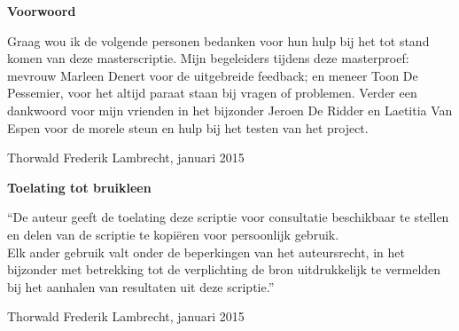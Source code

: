 
\newpage

\noindent \textbf{\huge Voorwoord}

\vspace{1.5cm}

\noindent


Graag wou ik de volgende personen bedanken voor hun hulp bij het tot stand komen van deze masterscriptie. Mijn begeleiders tijdens deze masterproef: mevrouw Marleen Denert voor de uitgebreide feedback; en meneer Toon De Pessemier, voor het altijd paraat staan bij vragen of problemen.
Verder een dankwoord voor mijn vrienden in het bijzonder Jeroen De Ridder en Laetitia Van Espen voor de morele steun en hulp bij het testen van het project.

\addvspace{4cm}

\noindent Thorwald Frederik Lambrecht, januari 2015\newpage

\noindent \textbf{\huge Toelating tot bruikleen}

\vspace{1.5cm}

\noindent
``De auteur geeft de toelating deze scriptie voor consultatie beschikbaar
te stellen en delen van de scriptie te kopi\"eren voor persoonlijk
gebruik.\\
Elk ander gebruik valt onder de beperkingen van het auteursrecht,
in het bijzonder met betrekking tot de verplichting de bron uitdrukkelijk
te vermelden bij het aanhalen van resultaten uit deze scriptie.''

\addvspace{4cm}

\noindent Thorwald Frederik Lambrecht, januari 2015
